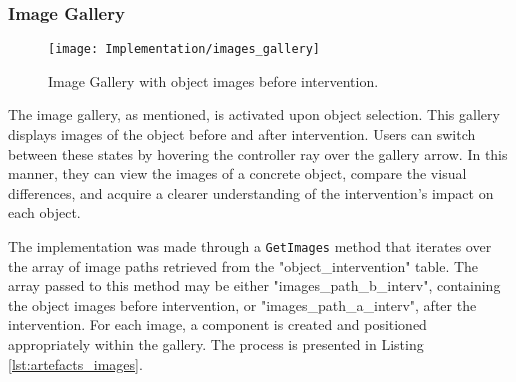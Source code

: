 \subsubsection{Image Gallery}
\label{sec:image_gallery}

\begin{figure}[h!]
    \centering
    \texttt{[image: Implementation/images\_gallery]}
    \caption{Image Gallery with object images before intervention.}
    \label{fig:image_gallery}
\end{figure}

The image gallery, as mentioned, is activated upon object selection. 
This gallery displays images of the object before and after intervention. 
Users can switch between these states by hovering the controller ray over the gallery arrow. 
In this manner, they can view the images of a concrete object, compare the visual differences, and acquire a clearer understanding of the intervention's impact on each object.

The implementation was made through a \texttt{GetImages} method that iterates over the array of image paths retrieved from the "object\_intervention" table. The array passed to this method may be either "images\_path\_b\_interv", containing the object images before intervention, or "images\_path\_a\_interv", after the intervention.
For each image, a component is created and positioned appropriately within the gallery.
The process is presented in Listing \ref{lst:artefacts_images}.

